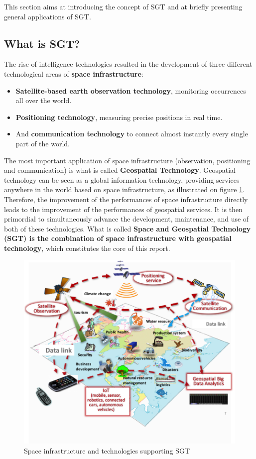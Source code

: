 \tab This section aims at introducing the concept of SGT and at briefly presenting general applications of SGT.

\subsection{What is SGT?} \label{wi_sgt}

The rise of intelligence technologies resulted in the development of three different technological areas of \textbf{space infrastructure}: 

\begin{itemize}

\item \textbf{Satellite-based earth observation technology}, monitoring occurrences all over the world.

\item \textbf{Positioning technology}, measuring precise positions in real time.

\item And \textbf{communication technology} to connect almost instantly every single part of the world.

\end{itemize}

The most important application of space infrastructure (observation, positioning and communication) is what is called \textbf{Geospatial Technology}. Geospatial technology can be seen as a global information technology, providing services anywhere in the world based on space infrastructure, as illustrated on figure \ref{sgt}. Therefore, the improvement of the performances of space infrastructure directly leads to the improvement of the performances of geospatial services. It is then primordial to simultaneously advance the development, maintenance, and use of both of these technologies. What is called \textbf{Space and Geospatial Technology (SGT) is the combination of space infrastructure with geospatial technology}, which constitutes the core of this report.
 
\begin{figure}[H]
\begin{center}
\includegraphics[width = 0.8\linewidth]{Figures/sgt.png}
\end{center}
\caption{Space infrastructure and technologies supporting SGT}
\label{sgt}
\end{figure}

